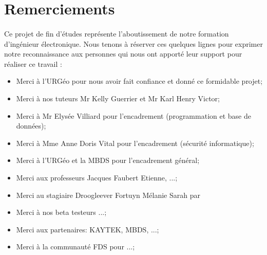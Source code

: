 \section{Remerciements}
\paragraph{}
Ce projet de fin d’études représente l'aboutissement de notre formation d’ingénieur électronique. 
Nous tenons à réserver ces quelques lignes pour exprimer notre
reconnaissance aux personnes qui nous ont apporté leur support pour réaliser ce travail :

\begin{itemize}
    \item Merci à l'URGéo pour nous avoir fait confiance et donné ce formidable projet;\par
    \item Merci à nos tuteurs Mr Kelly Guerrier et Mr Karl Henry Victor;\par
    \item Merci à  Mr Elysée Villiard pour l'encadrement (programmation et base de données);\par
    \item Merci à Mme Anne Doris Vital pour l'encadrement (sécurité informatique);\par
    \item Merci à l'URGéo et la MBDS pour l'encadrement général;\par
    \item Merci aux professeurs Jacques Faubert Etienne, ...;\par
    \item Merci au stagiaire Droogleever Fortuyn Mélanie Sarah par
    \item Merci à nos beta testeurs ...;\par
    \item Merci aux partenaires: KAYTEK, MBDS, ...;\par
    \item Merci à la communauté FDS pour ...;\par
\end{itemize}
